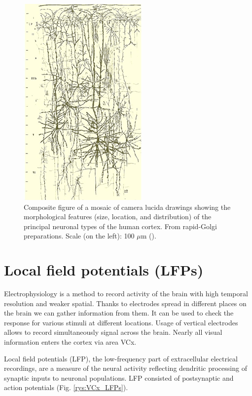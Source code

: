 \documentclass{pracalicmgr}
\begin{document}
        \begin{figure}[H]
        	\begin{center}
        		\includegraphics[scale=1]{morphology_neurons.png}
        	\end{center}
        	\caption{Composite figure of a mosaic of camera lucida drawings showing the morphological features (size, location, and distribution) of the principal neuronal types of the human cortex. From rapid-Golgi preparations. Scale (on the left): 100 $\mu$m  (\cite{morphology}).}
        	\label{rys:morphology_neurons}
        \end{figure}   
             
        
        \section{Local field potentials (LFPs)}
        Electrophysiology is a method to record activity of the brain with high temporal resolution and weaker spatial. Thanks to electrodes spread in different places on the brain we can gather information from them. It can be used to check the response for various stimuli at different locations. Usage of vertical electrodes allows to record simultaneously signal across the brain. Nearly all visual information enters the cortex via area VCx. 
        
        Local field potentials (LFP), the low-frequency part of extracellular electrical
        recordings, are a measure of the neural activity reflecting dendritic
        processing of synaptic inputs to neuronal populations. LFP consisted of postsynaptic and action potentials  (Fig. \ref{rys:VCx_LFPs}).
        
\end{document}

